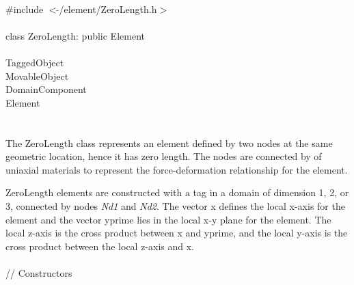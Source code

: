 
   \\
\indent \#include $<\tilde{ }$/element/ZeroLength.h$>$  \\

  \\
\indent class ZeroLength: public Element \\

 \\
\indent TaggedObject \\
\indent MovableObject \\
\indent\indent DomainComponent \\
\indent\indent\indent Element \\
\indent\indent\indent{} \\

  \\
\indent 
The ZeroLength class represents an element defined by two nodes at the same geometric
location, hence it has zero length.
The nodes are connected by 
of uniaxial materials to represent the force-deformation relationship for the element. 

ZeroLength elements are constructed with a \p tag in a domain of \p dimension 1, 2, or 3,
connected by nodes {\em Nd1} and {\em Nd2}. 
The vector \p x defines the local x-axis for the element and the vector \p yprime
lies in the local x-y plane for the element.  The local z-axis is the cross product between 
\p x and \p yprime, and the local y-axis is the cross product between the local z-axis
and \p x.
\\

 \\
\indent // Constructors \\
 \\

 \\

